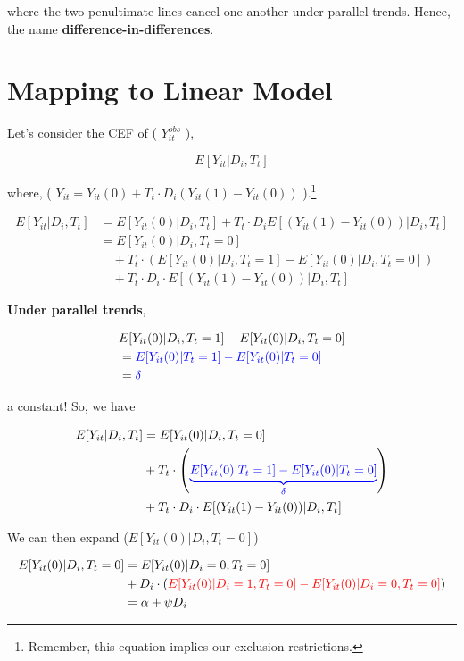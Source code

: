 \documentclass[
  letterpaper,
  DIV=11,
  numbers=noendperiod]{scrreprt}
\theoremstyle{definition}
\theoremstyle{remark}
\begin{document}
where the two penultimate lines cancel one another under parallel
trends. Hence, the name \textbf{difference-in-differences}.

\hypertarget{mapping-to-linear-model}{%
\section{Mapping to Linear Model}\label{mapping-to-linear-model}}

Let's consider the CEF of ( \(Y_{it}^{obs}\) ),

\[
E[Y_{it}|D_i,T_t]
\]

where, ( \(Y_{it} = Y_{it}(0) + T_t \cdot D_i(Y_{it}(1) - Y_{it}(0))\)
).\footnote{Remember, this equation implies our exclusion restrictions.}

\[
\begin{aligned}
E[Y_{it}|D_i,T_t] &= E[Y_{it}(0)|D_i,T_t] + T_t \cdot D_i E[(Y_{it}(1) - Y_{it}(0))|D_i,T_t] \\
&= E[Y_{it}(0)|D_i,T_t=0] \\
&\quad + T_t \cdot \left( E[Y_{it}(0)|D_i,T_t=1] - E[Y_{it}(0)|D_i,T_t=0] \right) \\
&\quad + T_t \cdot D_i \cdot E[(Y_{it}(1) - Y_{it}(0))|D_i,T_t]
\end{aligned}
\]

\textbf{Under parallel trends},

\[
\begin{aligned}
&E[Y_{it}(0)|D_i,T_t=1]-E[Y_{it}(0)|D_i,T_t=0] \\
&= \textcolor{blue}{E[Y_{it}(0)|T_t=1]-E[Y_{it}(0)|T_t=0]} \\
&= \textcolor{blue}{\delta}
\end{aligned}
\]

a constant! So, we have

\[
\begin{aligned}
E[Y_{it}|D_i,T_t] &= E[Y_{it}(0)|D_i,T_t=0] \\
&+ T_t \cdot \left( \textcolor{blue}{\underbrace{E[Y_{it}(0)|T_t=1]-E[Y_{it}(0)|T_t=0]}_{\delta}} \right) \\
&+ T_t \cdot D_i \cdot E[(Y_{it}(1)-Y_{it}(0))|D_i,T_t]
\end{aligned}
\]

We can then expand (\(E[Y_{it}(0)|D_i, T_t=0]\))

\[
\begin{aligned}
E[Y_{it}(0)|D_i,T_t=0] &= E[Y_{it}(0)|D_i=0,T_t=0] \\
&+ D_i \cdot \left( \textcolor{red}{E[Y_{it}(0)|D_i=1,T_t=0] - E[Y_{it}(0)|D_i=0,T_t=0]} \right) \\
&= \alpha + \psi D_i
\end{aligned}
\]
\end{document}
